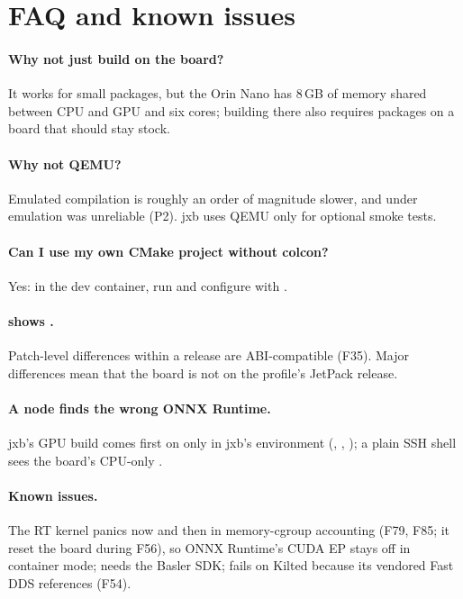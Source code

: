 \documentclass[11pt,a4paper]{article}
\newcommand{\codeb}[1]{\texttt{\detokenize{#1}}}      %
\newcommand{\jxb}{\textsf{jxb}}
\newcommand{\finding}[1]{\textsf{\small F#1}}
\begin{document}
\section{FAQ and known issues}\label{app:faq}
\paragraph{Why not just build on the board?} It works for small packages, but the Orin Nano has 8\,GB of memory shared
between CPU and GPU and six cores; building there also requires  packages on a board that should stay stock.

\paragraph{Why not QEMU?} Emulated compilation is roughly an order of magnitude slower, and  under emulation
was unreliable (P2). \jxb{} uses QEMU only for optional smoke tests.

\paragraph{Can I use my own CMake project without colcon?} Yes: in the dev container, run
 and configure with .

\paragraph{\codeb{jxb board check} shows \codeb{DIFF}.} Patch-level differences within a release are ABI-compatible
(\finding{35}). Major differences mean that the board is not on the profile's JetPack release.

\paragraph{A node finds the wrong ONNX Runtime.} \jxb's GPU build comes first on  only in \jxb's
environment (, , ); a plain SSH shell sees the board's CPU-only
.

\paragraph{Known issues.} The RT kernel panics now and then in memory-cgroup accounting (\finding{79}, \finding{85}; it reset the board during \finding{56}), so ONNX Runtime's CUDA EP stays off in container mode;  needs the Basler SDK;  fails on
Kilted because its vendored Fast DDS references  (\finding{54}).
\end{document}
